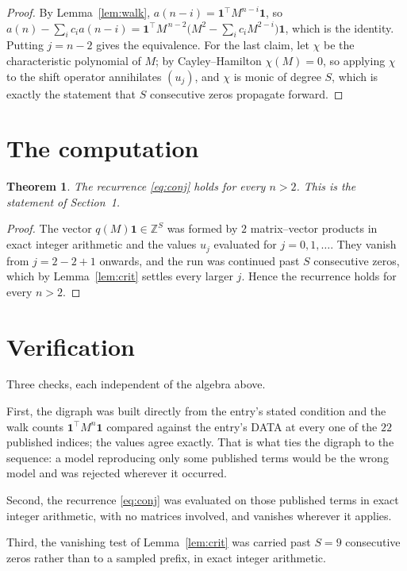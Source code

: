 \documentclass[11pt,a4paper]{article}
\theoremstyle{plain}
\newtheorem{theorem}{Theorem}
\theoremstyle{definition}
\begin{document}
\begin{proof}
By Lemma~\ref{lem:walk}, $a(n-i)=\mathbf{1}^{\!\top}M^{n-i}\mathbf{1}$, so
$a(n)-\sum_i c_i a(n-i)
=\mathbf{1}^{\!\top}M^{\,n-2}\bigl(M^{2}-\sum_i c_i M^{2-i}\bigr)
\mathbf{1}$, which is the identity. Putting $j=n-2$ gives the equivalence. For the
last claim, let $\chi$ be the characteristic polynomial of $M$; by Cayley--Hamilton
$\chi(M)=0$, so applying $\chi$ to the shift operator annihilates $(u_j)$, and $\chi$ is
monic of degree $S$, which is exactly the statement that $S$ consecutive zeros propagate
forward.
\end{proof}

\section{The computation}

\begin{theorem}
The recurrence \eqref{eq:conj} holds for every $n>2$. This is the statement of
Section~1.
\end{theorem}

\begin{proof}
The vector $q(M)\mathbf{1}\in\mathbb{Z}^{S}$ was formed by $2$ matrix--vector
products in exact integer arithmetic and the values $u_j$ evaluated for
$j=0,1,\dots$. They vanish from $j=2-2+1$ onwards, and the run was continued past
$S$ consecutive zeros, which by Lemma~\ref{lem:crit} settles every larger $j$. Hence the
recurrence holds for every $n>2$.
\end{proof}

\section{Verification}

Three checks, each independent of the algebra above.

First, the digraph was built directly from the entry's stated condition and the walk counts
$\mathbf{1}^{\!\top}M^{n}\mathbf{1}$ compared against the entry's DATA at every one of
the $22$ published indices; the values agree exactly. That is what ties the digraph to
the sequence: a model reproducing only some published terms would be the wrong model and
was rejected wherever it occurred.

Second, the recurrence \eqref{eq:conj} was evaluated on those published terms in exact
integer arithmetic, with no matrices involved, and vanishes wherever it applies.

Third, the vanishing test of Lemma~\ref{lem:crit} was carried past $S=9$ consecutive
zeros rather than to a sampled prefix, in exact integer arithmetic.
\end{document}
